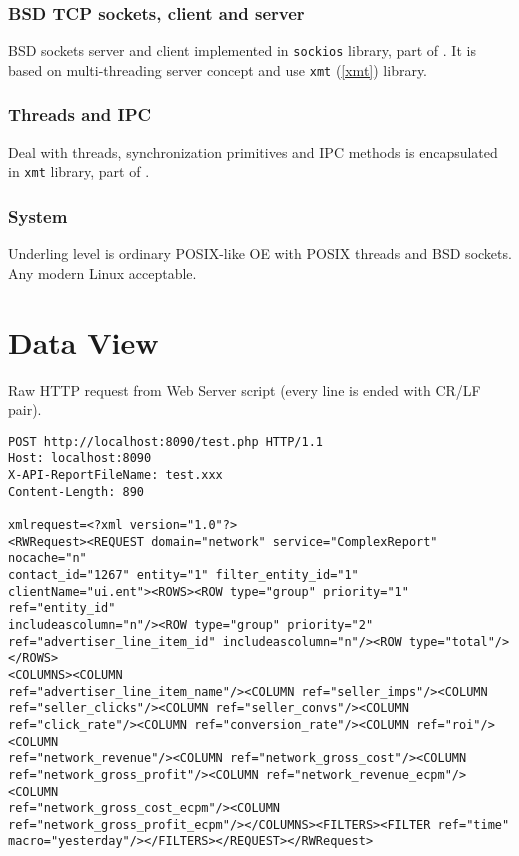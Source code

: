 \documentclass[a4paper,twoside]{article}
\begin{document}
\subsubsection{BSD TCP sockets, client and server\label{sockios}}

BSD sockets server and client implemented in \verb|sockios| library, part of
\cite{ComplementProject}. It is based on
multi-threading server concept and use \verb|xmt| (\ref{xmt}) library.

\subsubsection{Threads and IPC\label{xmt}}

Deal with threads, synchronization primitives and IPC methods
is encapsulated in \verb|xmt| library, part of \cite{ComplementProject}.

\subsubsection{System}

Underling level is ordinary POSIX-like OE with POSIX threads and BSD
sockets. Any modern Linux acceptable.

\section{Data View\label{DataView}}

Raw HTTP request from Web Server script (every line is ended with CR/LF pair).
\begin{verbatim}
POST http://localhost:8090/test.php HTTP/1.1
Host: localhost:8090
X-API-ReportFileName: test.xxx
Content-Length: 890

xmlrequest=<?xml version="1.0"?>
<RWRequest><REQUEST domain="network" service="ComplexReport" nocache="n" 
contact_id="1267" entity="1" filter_entity_id="1"
clientName="ui.ent"><ROWS><ROW type="group" priority="1" ref="entity_id"
includeascolumn="n"/><ROW type="group" priority="2"
ref="advertiser_line_item_id" includeascolumn="n"/><ROW type="total"/></ROWS>
<COLUMNS><COLUMN
ref="advertiser_line_item_name"/><COLUMN ref="seller_imps"/><COLUMN
ref="seller_clicks"/><COLUMN ref="seller_convs"/><COLUMN
ref="click_rate"/><COLUMN ref="conversion_rate"/><COLUMN ref="roi"/><COLUMN
ref="network_revenue"/><COLUMN ref="network_gross_cost"/><COLUMN
ref="network_gross_profit"/><COLUMN ref="network_revenue_ecpm"/><COLUMN
ref="network_gross_cost_ecpm"/><COLUMN
ref="network_gross_profit_ecpm"/></COLUMNS><FILTERS><FILTER ref="time"
macro="yesterday"/></FILTERS></REQUEST></RWRequest>
\end{verbatim}
\end{document}
